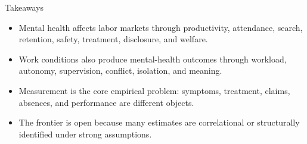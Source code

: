 \documentclass[aspectratio=169,11pt]{beamer}
\begin{document}
\begin{frame}{Takeaways}
\begin{itemize}
    \item Mental health affects labor markets through productivity, attendance, search, retention, safety, treatment, disclosure, and welfare.
    \item Work conditions also produce mental-health outcomes through workload, autonomy, supervision, conflict, isolation, and meaning.
    \item Measurement is the core empirical problem: symptoms, treatment, claims, absences, and performance are different objects.
    \item The frontier is open because many estimates are correlational or structurally identified under strong assumptions.
\end{itemize}
\end{frame}
\end{document}
